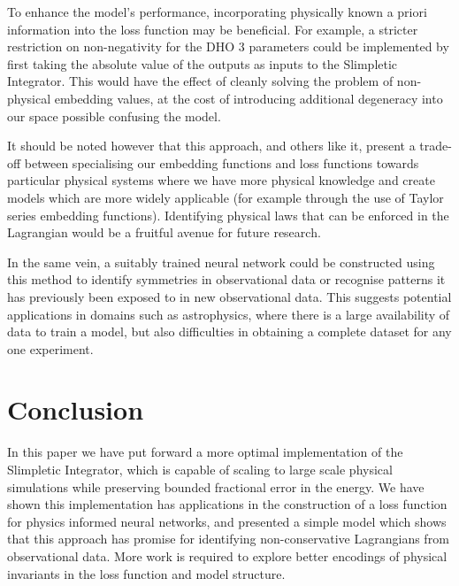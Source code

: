 To enhance the model's performance, incorporating physically known a priori information into the loss function may be beneficial. For example, a stricter restriction on non-negativity for the DHO 3 parameters could be implemented by first taking the absolute value of the outputs as inputs to the Slimpletic Integrator. This would have the effect of cleanly solving the problem of non-physical embedding values, at the cost of introducing additional degeneracy into our space possible confusing the model.

It should be noted however that this approach, and others like it, present a trade-off between specialising our embedding functions and loss functions towards particular physical systems where we have more physical knowledge and create models which are more widely applicable (for example through the use of Taylor series embedding functions).
Identifying physical laws that can be enforced in the Lagrangian would be a fruitful avenue for future research.

In the same vein, a suitably trained neural network could be constructed using this method to identify symmetries in observational data or recognise patterns it has previously been exposed to in new observational data. This suggests potential applications in domains such as astrophysics, where there is a large availability of data to train a model, but also difficulties in obtaining a complete dataset for any one experiment.

\section{Conclusion}

In this paper we have put forward a more optimal implementation of the Slimpletic Integrator, which is capable of scaling to large scale physical simulations while preserving bounded fractional error in the energy. We have shown this implementation has applications in the construction of a loss function for physics informed neural networks, and presented a simple model which shows that this approach has promise for identifying non-conservative Lagrangians from observational data. More work is required to explore better encodings of physical invariants in the loss function and model structure.
